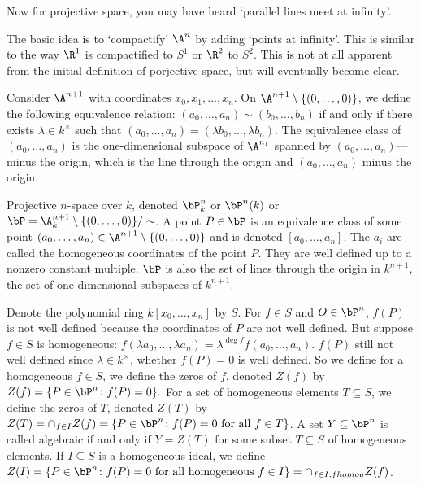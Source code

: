 Now for projective space, you may have heard `parallel lines meet at infinity'. 


The basic idea is to `compactify' $\A^n$ by adding `points at infinity'. This is similar to the way $\R^1$ is compactified to $S^1$ or $\R^2$ to $S^2$. This is not at all apparent from the initial definition of porjective space, but will eventually become clear. 


Consider $\A^{n+1}$ with coordinates $x_0,x_1,\ldots,x_n$. On $\A^{n+1} \setminus \{(0,\ldots,0)\}$, we define the following equivalence relation: $(a_0,\ldots,a_n) \sim (b_0,\ldots,b_n)$ if and only if there exists $\lambda \in k^\times$ such that $(a_0,\ldots,a_n)= (\lambda b_0,\ldots,\lambda b_n)$. The equivalence class of $(a_0,\ldots,a_n)$ is the one-dimensional subspace of $\A^{n_1}$ spanned by $(a_0,\ldots,a_n)$---minus the origin, which is the line through the origin and $(a_0,\ldots,a_n)$ minus the origin. 


\begin{dfn}
Projective $n$-space over $k$, denoted $\bP_k^n$ or $\bP^n(k)$ or $\bP= \A_k^{n+1} \setminus \{(0,\ldots,0)\}/\sim$. A point $P \in \bP$ is an equivalence class of some point $(a_0,\ldots,a_n) \in \A^{n+1} \setminus \{(0,\ldots,0)\}$ and is denoted $[a_0,\ldots,a_n]$. The $a_i$ are called the homogeneous coordinates of the point $P$. They are well defined up to a nonzero constant multiple. $\bP$ is also the set of lines through the origin in $k^{n+1}$, the set of one-dimensional subspaces of $k^{n+1}$. 
\end{dfn}



Denote the polynomial ring $k[x_0,\ldots,x_n]$ by $S$. For $f \in S$ and $O \in \bP^n$, $f(P)$ is not well defined because the coordinates of $P$ are not well defined. But suppose $f \in S$ is homogeneous: $f(\lambda a_0,\ldots, \lambda a_n) = \lambda^{\deg f} f(a_0,\ldots,a_n)$. $f(P)$ still not well defined since $\lambda \in k^\times$, whether $f(P)=0$ is well defined. So we define for a homogeneous $f \in S$, we define the zeros of $f$, denoted $Z(f)$ by $Z(f)= \{ P \in \bP^n \colon f(P)= 0\}.$ For a set of homogeneous elements $T \subseteq S$, we define the zeros of $T$, denoted $Z(T)$ by $Z(T)= \cap_{f \in I} Z(f)= \{P \in \bP^n \colon f(P)=0 \text{ for all }f \in T\}$. A set $Y \subseteq \bP^n$ is called algebraic if and only if $Y= Z(T)$ for some subset $T \subseteq S$ of homogeneous elements. If $I \subseteq S$ is a homogeneous ideal, we define $Z(I)= \{ P \in \bP^n \colon f(P)=0 \text{ for all homogeneous } f \in I\}= \cap_{f \in I, f homog} Z(f)$.


